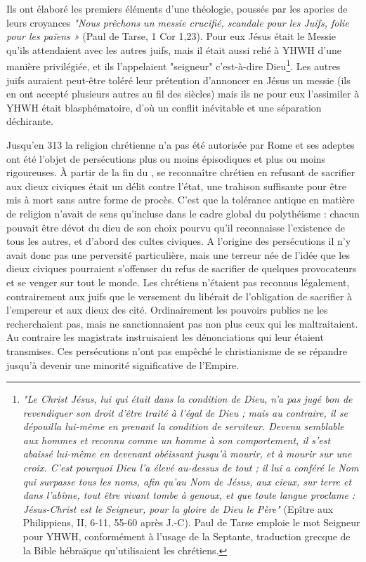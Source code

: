 Ils ont élaboré les premiers éléments d'une théologie, poussés par les apories de leurs croyances \emph{"Nous prêchons un messie crucifié, scandale pour les Juifs, folie pour les païens »}  (Paul de Tarse, 1 Cor 1,23). Pour eux Jésus était le Messie qu'ils attendaient avec les autres juifs, mais il était aussi relié à YHWH d'une manière privilégiée, et ils l'appelaient "seigneur" c'est-à-dire Dieu\footnote{\emph{"Le Christ Jésus, lui qui était dans la condition de Dieu, n'a pas jugé bon de revendiquer son droit d'être traité à l'égal de Dieu ; mais au contraire, il se dépouilla lui-même en prenant la condition de serviteur. Devenu semblable aux hommes et reconnu comme un homme à son comportement, il s'est abaissé lui-même en devenant obéissant jusqu'à mourir, et à mourir sur une croix. C'est pourquoi Dieu l'a élevé au-dessus de tout ; il lui a conféré le Nom qui surpasse tous les noms, afin qu'au Nom de Jésus, aux cieux, sur terre et dans l'abîme, tout être vivant tombe à genoux, et que toute langue proclame : Jésus-Christ est le Seigneur, pour la gloire de Dieu le Père"} (Epître aux Philippiens, II, 6-11, 55-60 après J.-C). Paul de Tarse emploie le mot Seigneur pour YHWH, conformément à l'usage de la Septante, traduction grecque de la Bible hébraïque qu'utilisaient les chrétiens.}. Les autres juifs auraient peut-être toléré leur prétention d'annoncer en Jésus un messie (ils en ont accepté plusieurs autres au fil des siècles) mais ils ne pour eux l'assimiler à YHWH était blasphématoire, d'où un conflit inévitable et une séparation déchirante.

Jusqu'en 313 la religion chrétienne n'a pas été autorisée par Rome et ses adeptes ont été l'objet de persécutions plus ou moins épisodiques et plus ou moins rigoureuses. À partir de la fin du , se reconnaître chrétien en refusant de sacrifier aux dieux civiques était un délit contre l'état, une trahison suffisante pour être mis à mort sans autre forme de procès. C'est que la tolérance antique en matière de religion n'avait de sens qu'incluse dans le cadre global du polythéisme : chacun pouvait être dévot du dieu de son choix pourvu qu'il reconnaisse l'existence de tous les autres, et d'abord des cultes civiques. A l'origine des persécutions il n'y avait donc pas une perversité particulière, mais une terreur née de l'idée que les dieux civiques pourraient s'offenser du refus de sacrifier de quelques provocateurs et se venger sur tout le monde. Les chrétiens n'étaient pas reconnus légalement, contrairement aux juifs que le versement du  libérait de l'obligation de sacrifier à l'empereur et aux dieux des cité. Ordinairement les pouvoirs publics ne les recherchaient pas, mais ne sanctionnaient pas non plus ceux qui les maltraitaient. Au contraire les magistrats instruisaient les dénonciations qui leur étaient transmises.  
Ces persécutions n'ont pas empêché le christianisme de se répandre jusqu'à devenir une minorité significative de l'Empire. 

